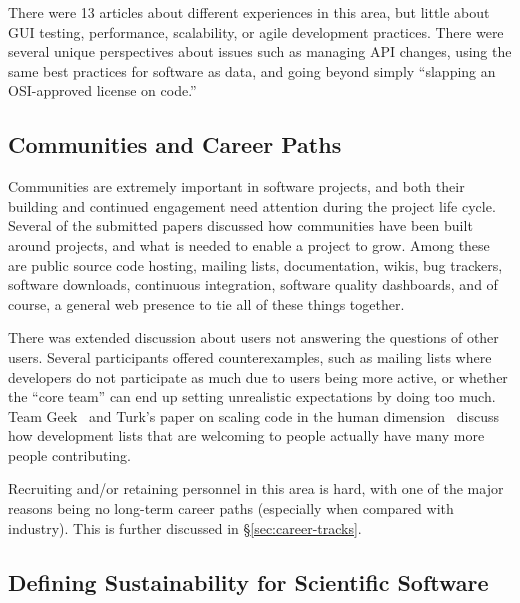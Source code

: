 \documentclass[11pt, oneside]{amsart}
\begin{document}
There were 13 articles about different experiences in this area, but little
about GUI testing, performance, scalability, or agile development practices.
There were several unique perspectives about issues such as managing API
changes, using the same best practices for software as data, and going beyond
simply ``slapping an OSI-approved license on code.''

\subsection{Communities and Career Paths}

Communities are extremely important in software projects, and both their
building and continued engagement need attention during the project life cycle.
Several of the submitted papers discussed how communities have been built around
projects, and what is needed to enable a project to grow. Among these are public
source code hosting, mailing lists, documentation, wikis, bug trackers, software
downloads, continuous integration, software quality dashboards, and of course,
a general web presence to tie all of these things together.

There was extended discussion about users not answering the questions of other
users. Several participants
offered counterexamples, such as mailing lists where developers do not participate
as much due to users being more active, or whether the ``core
team'' can end up setting unrealistic expectations by doing too much. Team Geek~\cite{opac-b1134063}
and Turk's paper on scaling code in the human dimension~\cite{Turk:2013:SCH:2484762.2484782}  discuss how development
lists that are welcoming to people actually have many more people contributing.

Recruiting and/or retaining personnel in this area is hard,
with one of the major reasons being no long-term career paths (especially when
compared with industry). This is further discussed in \S\ref{sec:career-tracks}.

%

\subsection{Defining Sustainability for Scientific Software}
\end{document}
